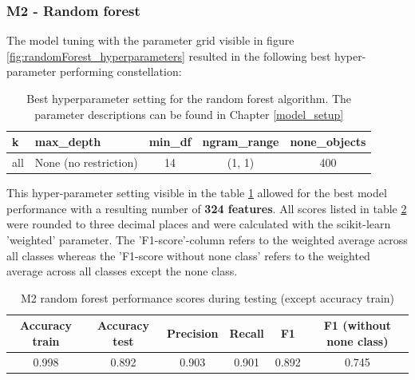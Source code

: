 \subsubsection{M2 - Random forest}
The model tuning with the parameter grid visible in figure \ref{fig:randomForest_hyperparameters} resulted in the following best hyper-parameter performing constellation:\\

\begin{table}[ht]
\begin{center}
\caption{Best hyperparameter setting for the random forest algorithm. The parameter descriptions can be found in Chapter \ref{model_setup}}\vspace{1ex}
\label{tab:m2_randomForest_bestParams}
\begin{tabular}{llccc}\hline
k & max\_depth & min\_df & ngram\_range & none\_objects \\ \hline
all & None (no restriction) & 14 & (1, 1) & 400 \\ \hline
\end{tabular}
\end{center}
\end{table}

This hyper-parameter setting visible in the table \ref{tab:m2_randomForest_bestParams} allowed for the best model performance with a resulting number of \textbf{324 features}. All scores listed in table \ref{tab:m2_randomForest_bestscores} were rounded to three decimal places and were calculated with the scikit-learn 'weighted' parameter. The 'F1-score'-column refers to the weighted average across all classes whereas the 'F1-score without none class' refers to the weighted average across all classes except the none class.

\begin{table}[ht]
\begin{center}
\caption{M2 random forest performance scores during testing (except accuracy train)}\vspace{1ex}
\label{tab:m2_randomForest_bestscores}
\begin{tabular}{cccccc}\hline
Accuracy train & Accuracy test & Precision & Recall & F1 & F1 (without none class)\\ \hline
0.998 & 0.892 & 0.903 & 0.901 & 0.892 & 0.745\\ \hline
\end{tabular}
\end{center}
\end{table}

